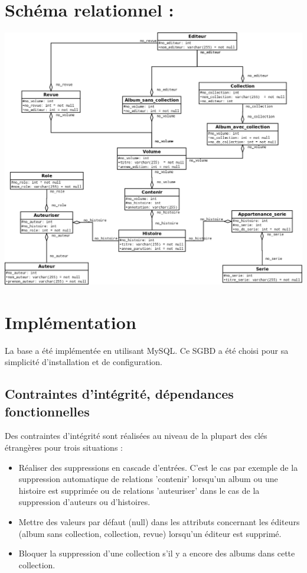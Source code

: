 \documentclass[12pt]{article}
\begin{document}
\section{Schéma relationnel :}

\noindent\includegraphics[width=\textwidth]{schema-relation}

\section{Implémentation }

La base a été implémentée en utilisant MySQL. Ce SGBD a été choisi pour sa
simplicité d'installation et de configuration.

\subsection{Contraintes d'intégrité, dépendances fonctionnelles}

Des contraintes d'intégrité sont réalisées au niveau de la plupart des clés
étrangères pour trois situations : 
\begin{itemize}
	\item Réaliser des suppressions en cascade d'entrées. C'est le cas par
		exemple de la suppression automatique de relations 'contenir'
		lorsqu'un album ou une histoire est supprimée ou de relations
		'auteuriser' dans le cas de la suppression d'auteurs ou d'histoires.
	\item Mettre des valeurs par défaut (null) dans les attributs concernant les
		éditeurs (album sans collection, collection, revue) lorsqu'un éditeur
		est supprimé.
	\item Bloquer la suppression d'une collection s'il y
		a encore des albums dans cette collection.
\end{itemize}
\end{document}
